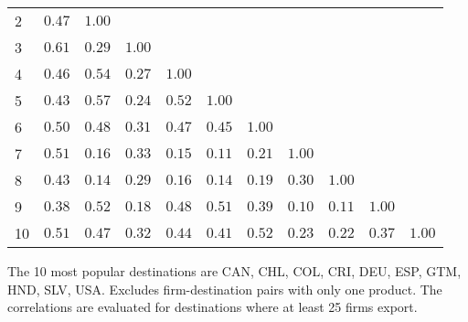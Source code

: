 \documentclass{article}
\begin{document}
\begin{table}[h]
{\begin{threeparttable}
\begin{tabular}{lrrrrrrrrrr}
2 & $0.47$   & $1.00$     &             &             &              &            &               &            &             &                        \\  
3 & $0.61$   & $0.29$     & $1.00$    &             &              &            &               &            &             &                        \\  
4 & $0.46$   & $0.54$     & $0.27$    &  $1.00$   &              &            &               &            &             &                         \\  
5 & $0.43$   & $0.57$     & $0.24$    &  $0.52$   & $1.00$     &            &               &            &             &                         \\  
6 & $0.50$   & $0.48$     & $0.31$    &  $0.47$   & $0.45$     &  $1.00$  &               &            &             &                         \\  
7 & $0.51$   & $0.16$     & $0.33$    &  $0.15$   & $0.11$     &  $0.21$  &  $1.00$     &            &             &                         \\  
8 & $0.43$   & $0.14$     & $0.29$    &  $0.16$   & $0.14$     &  $0.19$  &  $0.30$     & $1.00$   &             &                         \\  
9 & $0.38$   & $0.52$     & $0.18$    &  $0.48$   & $0.51$     &  $0.39$  &  $0.10$     & $0.11$   & $1.00$    &                         \\  
10 & $0.51$ & $0.47$    & $0.32$   &  $0.44$  & $0.41$    &  $0.52$ &  $0.23$    & $0.22$  & $0.37$   & $1.00$ \\  
\hline
\end{tabular}
\begin{tablenotes}
\small
\item  \noindent  \footnotesize{The 10 most popular destinations are CAN, CHL, COL, CRI, DEU, ESP, GTM, HND, SLV, USA. Excludes firm-destination pairs with only one product. The correlations are evaluated for destinations where at least 25 firms export.}
\end{tablenotes}
\end{threeparttable}
}
\end{table}
\end{document}
